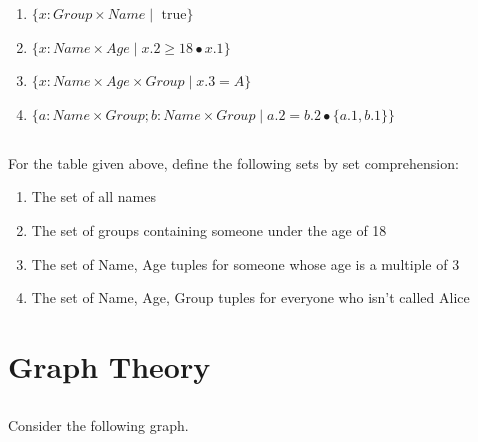 \documentclass[twocolumn]{article}
\newcommand\mrk[1]{}
\begin{document}
    \begin{enumerate}
        \item $ \{ x : Group \times Name \mid \text{ true} \} $ \mrk{1}
        \item $ \{ x : Name \times Age \mid x.2 \ge 18 \bullet x.1 \} $ \mrk{1}
        \item $ \{ x : Name \times Age \times Group \mid x.3 = A \} $ \mrk{1}
        \item $ \{ a : Name \times Group; b : Name \times Group \mid a.2 = b.2 \bullet \{a.1, b.1\} \} $ \mrk{1}
    \end{enumerate} 

\subsection{}

    For the table given above, define the following sets by set comprehension:

    \begin{enumerate}
        \item The set of all names \mrk{2}
        \item The set of groups containing someone under the age of 18 \mrk{2}
        \item The set of Name, Age tuples for someone whose age is a multiple of 3 \mrk{2}
        \item The set of Name, Age, Group tuples for everyone who isn't called Alice  \mrk{2}
    \end{enumerate}

\clearpage
\section{Graph Theory}

\subsection{}

    Consider the following graph.

    \begin{figure}[h!]
        \centering
    \end{figure}
\end{document}
